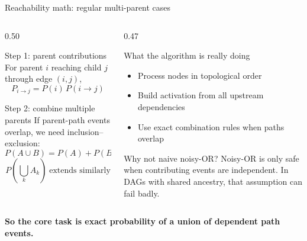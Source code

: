 \documentclass[aspectratio=169]{beamer}
\newcommand{\tightlist}{\setlength{\itemsep}{4pt}\setlength{\parskip}{2pt}}
\begin{document}
\begin{frame}{Reachability math: regular multi-parent cases}
\small
\begin{columns}[t]
\begin{column}{0.50\textwidth}
\begin{block}{Step 1: parent contributions}
For parent $i$ reaching child $j$ through edge $(i,j)$,
\[
P_{i\to j} = P(i)\,P(i\to j)
\]
\end{block}

\begin{block}{Step 2: combine multiple parents}
If parent-path events overlap, we need inclusion--exclusion:
\[
P(A\cup B)=P(A)+P(B)-P(A\cap B)
\]
\[
P\!\left(\bigcup_k A_k\right)\;\text{extends similarly}
\]
\end{block}
\end{column}

\begin{column}{0.47\textwidth}
\begin{block}{What the algorithm is really doing}
\begin{itemize}
\tightlist
\item Process nodes in topological order
\item Build activation from all upstream dependencies
\item Use exact combination rules when paths overlap
\end{itemize}
\end{block}

\vspace{0.15cm}
\begin{block}{Why not naive noisy-OR?}
\small
Noisy-OR is only safe when contributing events are independent. In DAGs with shared ancestry, that assumption can fail badly.
\end{block}
\end{column}
\end{columns}

\vspace{0.15cm}
\centering
\textcolor{juliapurple}{\textbf{So the core task is exact probability of a union of dependent path events.}}
\end{frame}
\end{document}
